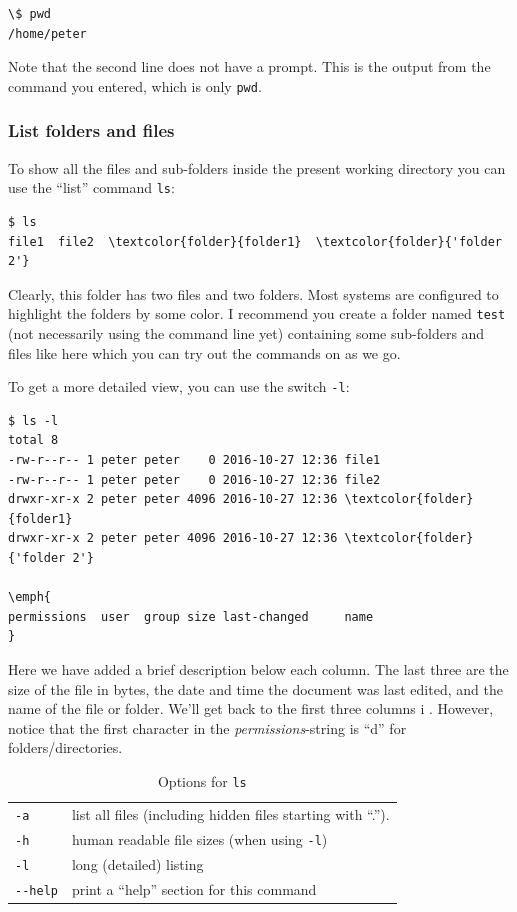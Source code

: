 \begin{Verbatim}[commandchars=\\\{\}]
\$ pwd
/home/peter
\end{Verbatim}
Note that the second line does not have a prompt. This is the output from the command you entered, which is only \verb|pwd|. 

\subsubsection{List folders and files}\label{sec:bash:ls}
To show all the files and sub-folders inside the present working directory you can use the ``list'' command \verb|ls|:

\begin{Verbatim}[commandchars=\\\{\}]
$ ls
file1  file2  \textcolor{folder}{folder1}  \textcolor{folder}{'folder 2'}
\end{Verbatim}
\ignore{$}
Clearly, this folder has two files and two folders. Most systems are configured to highlight the folders by some color. I recommend you create a folder named \verb|test| (not necessarily using the command line yet) containing some sub-folders and files like here which you can try out the commands on as we go.

To get a more detailed view, you can use the switch \verb|-l|:

\begin{Verbatim}[commandchars=\\\{\}]
$ ls -l
total 8
-rw-r--r-- 1 peter peter    0 2016-10-27 12:36 file1
-rw-r--r-- 1 peter peter    0 2016-10-27 12:36 file2
drwxr-xr-x 2 peter peter 4096 2016-10-27 12:36 \textcolor{folder}{folder1}
drwxr-xr-x 2 peter peter 4096 2016-10-27 12:36 \textcolor{folder}{'folder 2'}

\emph{
permissions  user  group size last-changed     name
}
\end{Verbatim}
\ignore{$}
Here we have added a brief description below each column. The last three are the size of the file in bytes, the date and time the document was last edited, and the name of the file or folder. We'll get back to the first three columns i . However, notice that the first character in the \emph{permissions}-string is ``d'' for folders/directories.

\begin{table}
	\centering
	\caption{Options for \texttt{ls}}
	\begin{tabular}{ll}
	\hline
	\verb|-a|		&	list all files (including hidden files starting with ``.'').	\\
	\verb|-h|		&	human readable file sizes (when using \verb|-l|)				\\
	\verb|-l|		&	long (detailed) listing										\\
	\verb|--help|	&	print a ``help'' section for this command
	\end{tabular}
	\label{tab:bash:ls}
\end{table}

